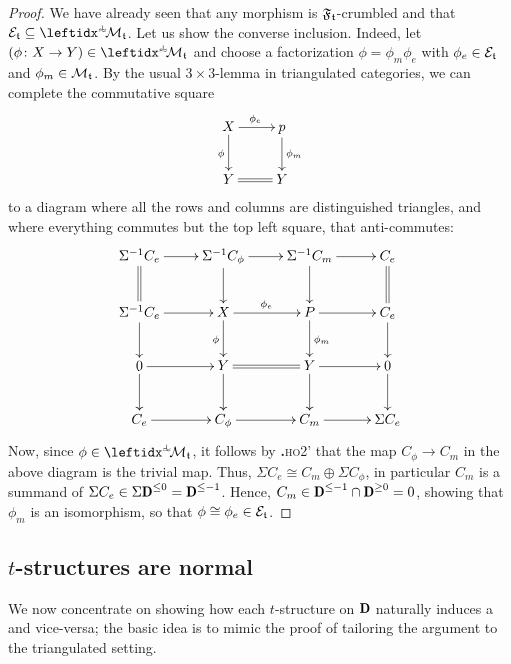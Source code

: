 \begin{proof}
We have already seen that any morphism is $\mathfrak{F}_{\mathfrak{t}}$-crumbled and that $\E_\t\subseteq \lhorth{\!\M_\t}$. Let us show the converse inclusion. Indeed, let $(\phi\colon X\to Y)\in \lhorth{\!\M_\t}$ and choose a factorization $\phi=\phi_m\phi_e$ with $\phi_e\in \mathcal{E}_{\mathfrak{t}}$ and $\phi_m\in\mathcal{M}_{\mathfrak{t}}$. By the usual $3\times 3$-lemma in triangulated categories, we can complete the commutative square
\[
\xymatrix{
X\ar[r]^{\phi_e}\ar[d]_{\phi}&p\ar[d]^{\phi_m}\\
Y\ar@{=}[r]&Y
}
\]
to a diagram where all the rows and columns are distinguished triangles, and where everything commutes but the top left square, that anti-commutes:
\[
\xymatrix{
\Sigma^{-1}C_e\ar@{=}[d]\ar[r]&\Sigma^{-1}C_\phi\ar[d]\ar[r]&\Sigma^{-1}C_m\ar[d]\ar[r]&C_e\ar@{=}[d]\\
\Sigma^{-1}C_e\ar[d]\ar[r]&X\ar[d]_\phi\ar[r]^{\phi_e}&P\ar[d]^{\phi_m}\ar[r]&C_e\ar[d]\\
0\ar[r]\ar[d]&Y\ar@{=}[r]\ar[d]&Y\ar[r]\ar[d]&0\ar[d]\\
C_e\ar[r]&C_\phi\ar[r]&C_m\ar[r]&\Sigma C_e}
\]
Now, since $\phi\in \lhorth{\!\M_\t}$, it follows by \textbf{.}\textsc{ho2}' that the map $C_\phi\to C_m$ in the above diagram is the trivial map. Thus, $\Sigma C_e\cong C_m\oplus \Sigma C_\phi$, in particular $C_m$ is a summand of $\Sigma C_e\in \Sigma  \cD^{\leq  0} = \cD^{\leq -1} $. Hence, $C_m\in  \cD^{\leq -1} \cap  \cD^{\geq 0} =0$, showing that $\phi_m$ is an isomorphism, so that $\phi\cong \phi_e\in \mathcal{E}_{\mathfrak{t}}$. 
\end{proof}

\subsection{$t$-structures are  normal \htth}
We now concentrate on showing how each $t$-structure on $\cD$ naturally induces a \htth and vice-versa; the basic idea is to mimic the proof of \cite[\athm\textbf{3.1.1}]{tstructures} tailoring the argument to the triangulated setting.

